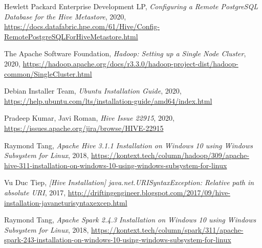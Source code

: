 \documentclass{article}
\begin{document}
\newpage
\begin{thebibliography}{9}
    Hewlett Packard Enterprise Development LP,
    \textit{Configuring a Remote PostgreSQL Database for the Hive Metastore},
    2020,
    \url{https://docs.datafabric.hpe.com/61/Hive/Config-RemotePostgreSQLForHiveMetastore.html}
    
    The Apache Software Foundation,
    \textit{Hadoop: Setting up a Single Node Cluster},
    2020,
    \url{https://hadoop.apache.org/docs/r3.3.0/hadoop-project-dist/hadoop-common/SingleCluster.html}

    Debian Installer Team,
    \textit{Ubuntu Installation Guide},
    2020,
    \url{https://help.ubuntu.com/lts/installation-guide/amd64/index.html}

    Pradeep Kumar, Javi Roman,
    \textit{Hive Issue 22915},
    2020,
    \url{https://issues.apache.org/jira/browse/HIVE-22915}

    Raymond Tang,
    \textit{Apache Hive 3.1.1 Installation on Windows 10 using Windows Subsystem for Linux},
    2018,
    \url{https://kontext.tech/column/hadoop/309/apache-hive-311-installation-on-windows-10-using-windows-subsystem-for-linux}

    Vu Duc Tiep,
    \textit{[Hive Installation] java.net.URISyntaxException: Relative path in absolute URI},
    2017,
    \url{http://driftingengineer.blogspot.com/2017/09/hive-installation-javaneturisyntaxexcep.html}

    Raymond Tang,
    \textit{Apache Spark 2.4.3 Installation on Windows 10 using Windows Subsystem for Linux},
    2018,
    \url{https://kontext.tech/column/spark/311/apache-spark-243-installation-on-windows-10-using-windows-subsystem-for-linux}
\end{thebibliography}
\end{document}
